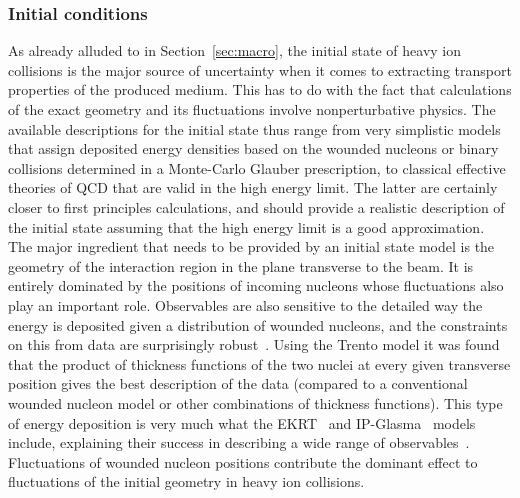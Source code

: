 \subsubsection{Initial conditions} \label{sec:initialstate}
As already alluded to in Section~\ref{sec:macro}, the initial state of 
  heavy ion collisions is the major source of uncertainty when it comes 
  to extracting transport properties of the produced medium. 
This has to do with the fact that calculations of the exact geometry and 
  its fluctuations involve nonperturbative physics. 
The available descriptions for the initial state thus range from very 
  simplistic models that assign deposited energy densities based on the 
  wounded nucleons or binary collisions determined in a Monte-Carlo 
  Glauber prescription, to classical effective theories of QCD that are 
  valid in the high energy limit. 
The latter are certainly closer to first principles calculations, and 
  should provide a realistic description of the initial state assuming 
  that the high energy limit is a good approximation.
The major ingredient that needs to be provided by an initial state model 
  is the geometry of the interaction region in the plane transverse 
  to the beam. 
It is entirely dominated by the positions of incoming nucleons whose 
  fluctuations also play an important role. 
Observables are also sensitive to the detailed way the energy is deposited 
  given a distribution of wounded nucleons, and the constraints on this 
  from data are surprisingly robust~\cite{Moreland:2018gsh}. 
Using the Trento model it was found that the product of thickness functions 
  of the two nuclei at every given transverse position gives the best description 
  of the data (compared to a conventional wounded nucleon model or other 
  combinations of thickness functions). 
This type of energy deposition is very much what the EKRT~\cite{Niemi:2015qia} 
  and IP-Glasma~\cite{Schenke:2012wb,Schenke:2012fw} models include, explaining 
  their success in describing a wide range of observables~\cite{Niemi:2015qia,Gale:2012rq}.
Fluctuations of wounded nucleon positions contribute the dominant effect to 
  fluctuations of the initial geometry in heavy ion collisions. 
